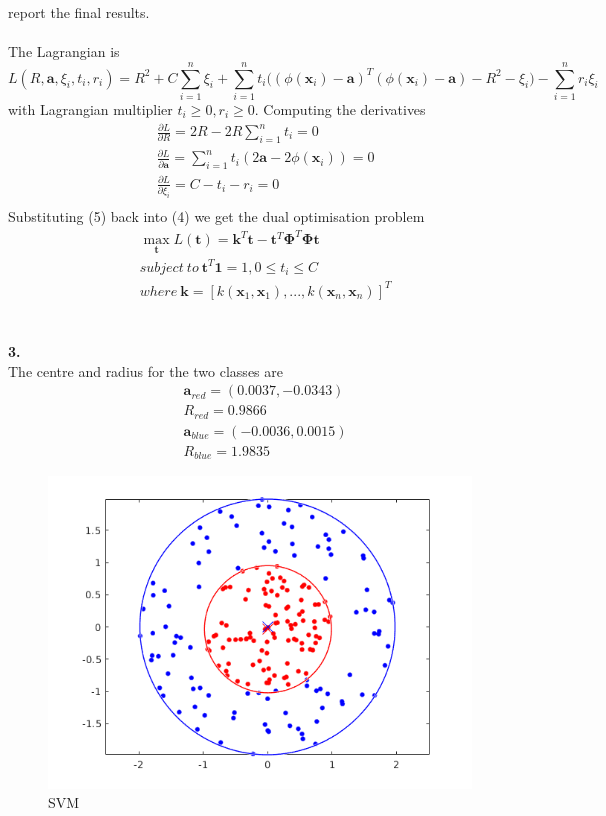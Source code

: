 \documentclass[a4paper]{article}
\begin{document}
report the final results.\\
\\
The Lagrangian is
\begin{equation}
    L(R,\bm a,\xi_i,t_i,r_i) = R^2 + C\sum_{i=1}^{n}\xi_i + \sum_{i=1}^{n}t_i\big((\phi(\bm{x}_i)-\bm{a})^T(\phi(\bm{x}_i)-\bm{a})-R^2-\xi_i\big) - \sum_{i=1}^{n}r_i\xi_i
\end{equation}
with Lagrangian multiplier $t_i \geq 0, r_i \geq 0$. Computing the derivatives
\begin{equation}
    \begin{aligned}
        &\frac{\partial L}{\partial R} = 2R - 2R \sum_{i=1}^{n}t_i = 0 \\
        &\frac{\partial L}{\partial \bm a} = \sum_{i=1}^{n}t_i(2\bm a - 2\phi(\bm{x}_i))=0\\
        &\frac{\partial L}{\partial \xi_i} = C-t_i-r_i = 0\\
    \end{aligned}
\end{equation}
Substituting (5) back into (4) we get the dual optimisation problem
\begin{equation}
    \begin{aligned}
        &\max_{\bm{t}}L(\bm t) = \bm k^T \bm t - \bm{t}^T\bm{\Phi}^T\bm{\Phi t}\\
        & subject\ to\ \bm t^T\bm 1 = 1, 0 \leq t_i \leq C \\
        & where\ \bm k = [k(\bm x_1, \bm x_1), ... ,k(\bm x_n, \bm x_n)]^T
    \end{aligned}
\end{equation}
\\
\\
\textbf{3.}\\
The centre and radius for the two classes are
\[
\begin{aligned}
    &\bm a_{red} = (0.0037, -0.0343) \\
    &R_{red} = 0.9866 \\
    &\bm a_{blue} = (-0.0036, 0.0015) \\
    &R_{blue} = 1.9835
\end{aligned}
\]

\begin{figure}[htb]
     \centering
     \includegraphics[width=1\linewidth]{../pic/SVM.png}
     \caption{SVM}\label{Fig:SVM}
\end{figure}
\end{document}
